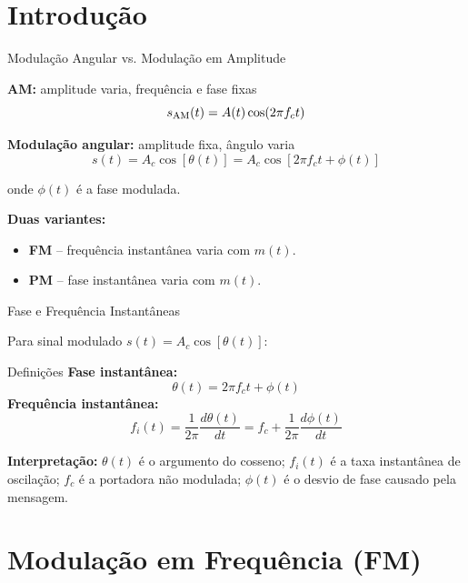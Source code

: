 
\section{Introdução}

\begin{frame}{Modulação Angular vs. Modulação em Amplitude}

\textbf{AM:} amplitude varia, frequência e fase fixas
\[
s_{\text{AM}}(t) = A(t) \cos(2\pi f_c t)
\]

\vspace{0.2cm}
\textbf{Modulação angular:} amplitude fixa, ângulo varia
\[
s(t) = A_c \cos[\theta(t)] = A_c \cos[2\pi f_c t + \phi(t)]
\]

onde $\phi(t)$ é a fase modulada.

\vspace{0.3cm}
\textbf{Duas variantes:}
\begin{itemize}
\item \textbf{FM} -- frequência instantânea varia com $m(t)$.
\item \textbf{PM} -- fase instantânea varia com $m(t)$.
\end{itemize}

\end{frame}


\begin{frame}{Fase e Frequência Instantâneas}

Para sinal modulado $s(t) = A_c \cos[\theta(t)]$:

\begin{block}{Definições}
\textbf{Fase instantânea:}
\[
\theta(t) = 2\pi f_c t + \phi(t)
\]
\textbf{Frequência instantânea:}
\[
f_i(t) = \frac{1}{2\pi} \frac{d\theta(t)}{dt} = f_c + \frac{1}{2\pi}\frac{d\phi(t)}{dt}
\]
\end{block}

\small
\textbf{Interpretação:} $\theta(t)$ é o argumento do cosseno; $f_i(t)$ é a taxa instantânea de oscilação; $f_c$ é a portadora não modulada; $\phi(t)$ é o desvio de fase causado pela mensagem.

\end{frame}


\section{Modulação em Frequência (FM)}


